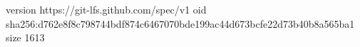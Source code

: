 version https://git-lfs.github.com/spec/v1
oid sha256:d762e8f8c798744bdf874c6467070bde199ac44d673bcfe22d73b40b8a565ba1
size 1613
